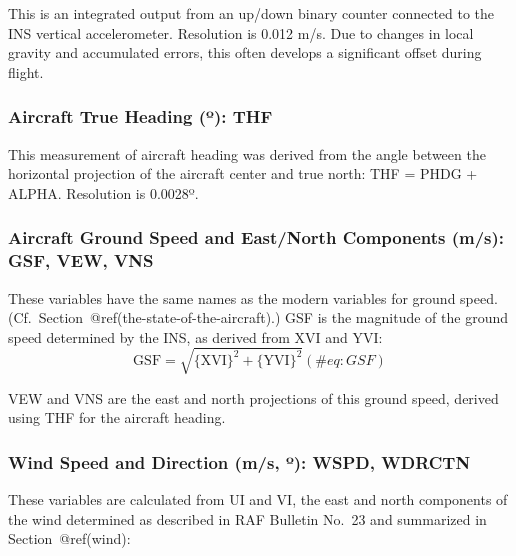 \documentclass[
  english,
]{book}
\begin{document}
This is an integrated output from an up/down binary counter connected to
the INS vertical accelerometer. Resolution is 0.012 m/s. Due to changes
in local gravity and accumulated errors, this often develops a
significant offset during flight.

\hypertarget{thf}{%
\subsubsection*{\texorpdfstring{Aircraft True Heading ({º}):
THF}{Aircraft True Heading (º): THF}}\label{thf}}

This measurement of aircraft heading was derived from the angle between
the horizontal projection of the aircraft center and true north: THF =
PHDG + ALPHA. Resolution is 0.0028{º}.

\hypertarget{gsf-obsolete}{%
\subsubsection*{Aircraft Ground Speed and East/North Components (m/s):
GSF, VEW, VNS}\label{gsf-obsolete}}

These variables have the same names as the modern variables for ground
speed. (Cf.~Section~@ref(the-state-of-the-aircraft).) GSF is the
magnitude of the ground speed determined by the INS, as derived from XVI
and YVI:\\

\begin{equation}
\mathrm{GSF=\sqrt{\{XVI\}^{2}+\{YVI\}^{2}}}
(\#eq:GSF)
\end{equation}

VEW and VNS are the east and north projections of this ground speed,
derived using THF for the aircraft heading.

\hypertarget{wspd}{%
\subsubsection*{\texorpdfstring{Wind Speed and Direction (m/s, {º}):
WSPD,
WDRCTN}{Wind Speed and Direction (m/s, º): WSPD, WDRCTN}}\label{wspd}}

These variables are calculated from UI and VI, the east and north
components of the wind determined as described in RAF Bulletin No.~23
and summarized in Section~@ref(wind):
\end{document}
